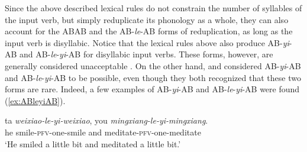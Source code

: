 \documentclass[11pt,a4paper,fleqn,draft]{article}
\newcommand{\type}[1]{{\normalfont\itshape #1\/}}
\newcommand{\phonliste}[1]{%
\mbox{%
$%
%
\left\langle \mbox{\normalfont\itshape#1} \right\rangle%
$%
}%
}
\let\textbf\emph
\begin{document}



Since the above described lexical rules do not constrain the number of syllables of the input verb, but simply reduplicate its phonology  as a whole,
they can also account for the ABAB and the AB-\emph{le}-AB forms of reduplication,
as long as the input verb is disyllabic.
Notice that  the lexical rules above also produce AB-\emph{yi}-AB and AB\hyp{}\emph{le}\hyp{}\emph{yi}\hyp{}AB for disyllabic input verbs.
These forms, however, are generally considered unacceptable \citetext{\citealp[160]{BascianoMelloni2017}, \citealp[275--276]{Hong1999}, \citealp[30]{LiThompson1981}, \citealp[239]{YangWei2017}}.
On the other hand, \citet[269]{Fan1964} and \citet[143]{Sui2018} considered AB-\emph{yi}-AB and AB-\emph{le}-\emph{yi}-AB to be possible, even though they both recognized that these two forms are rare.
Indeed, a few examples of AB-\emph{yi}-AB and AB-\emph{le}-\emph{yi}-AB were found (\ref{ex:ABleyiAB}).

\ea\label{ex:ABleyiAB}
 
 
 \ea\label{ex:AByiAB-rou2}
 \gll ta \textbf{weixiao-le-yi-weixiao}, you \textbf{mingxiang-le-yi-mingxiang}.\footnotemark\\
 he smile-\textsc{pfv}-one-smile and meditate-\textsc{pfv}-one-meditate\\
 \glt `He smiled a little bit and meditated a little bit.'
 
\end{document}
